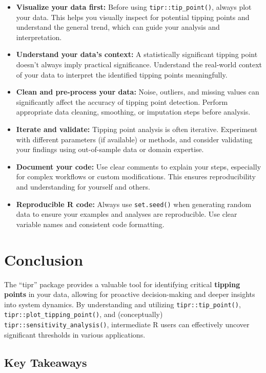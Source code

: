 \documentclass[
  10pt,
  letterpaper,
  DIV=11,
  numbers=noendperiod]{scrartcl}
\providecommand{\tightlist}{%
  \setlength{\itemsep}{0pt}\setlength{\parskip}{0pt}}
\begin{document}
\begin{itemize}
\tightlist
\item
  \textbf{Visualize your data first:} Before using
  \texttt{tipr::tip\_point()}, always plot your data. This helps you
  visually inspect for potential tipping points and understand the
  general trend, which can guide your analysis and interpretation.
\item
  \textbf{Understand your data's context:} A statistically significant
  tipping point doesn't always imply practical significance. Understand
  the real-world context of your data to interpret the identified
  tipping points meaningfully.
\item
  \textbf{Clean and pre-process your data:} Noise, outliers, and missing
  values can significantly affect the accuracy of tipping point
  detection. Perform appropriate data cleaning, smoothing, or imputation
  steps before analysis.
\item
  \textbf{Iterate and validate:} Tipping point analysis is often
  iterative. Experiment with different parameters (if available) or
  methods, and consider validating your findings using out-of-sample
  data or domain expertise.
\item
  \textbf{Document your code:} Use clear comments to explain your steps,
  especially for complex workflows or custom modifications. This ensures
  reproducibility and understanding for yourself and others.
\item
  \textbf{Reproducible R code:} Always use \texttt{set.seed()} when
  generating random data to ensure your examples and analyses are
  reproducible. Use clear variable names and consistent code formatting.
\end{itemize}

\section{Conclusion}\label{conclusion}

The ``tipr'' package provides a valuable tool for identifying critical
\textbf{tipping points} in your data, allowing for proactive
decision-making and deeper insights into system dynamics. By
understanding and utilizing \texttt{tipr::tip\_point()},
\texttt{tipr::plot\_tipping\_point()}, and (conceptually)
\texttt{tipr::sensitivity\_analysis()}, intermediate R users can
effectively uncover significant thresholds in various applications.

\subsection{Key Takeaways}\label{key-takeaways}
\end{document}
